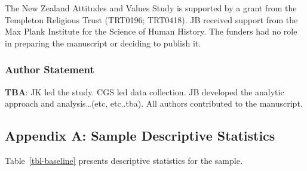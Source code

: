\documentclass[
  single column]{article}
\begin{document}
The New Zealand Attitudes and Values Study is supported by a grant from
the Templeton Religious Trust (TRT0196; TRT0418). JB received support
from the Max Plank Institute for the Science of Human History. The
funders had no role in preparing the manuscript or deciding to publish
it.

\subsubsection{Author Statement}\label{author-statement}

\textbf{TBA}: JK led the study. CGS led data collection. JB developed
the analytic approach and analysis\ldots(etc, etc..tba). All authors
contributed to the manuscript.

\newpage{}

\subsection{Appendix A: Sample Descriptive Statistics}\label{appendix-a}

Table~\ref{tbl-baseline} presents descriptive statistics for the sample.
\end{document}
